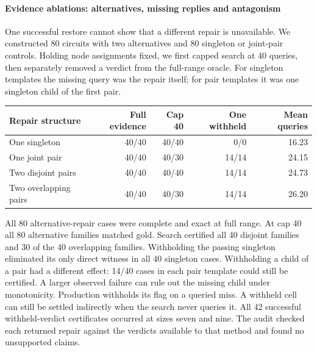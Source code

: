 \documentclass[11pt,letterpaper]{article}
\begin{document}
\paragraph{Evidence ablations: alternatives, missing replies and antagonism}\label{sec:evidence}
One successful restore cannot show that a different repair is unavailable. We constructed 80 circuits with two alternatives and 80 singleton or joint-pair controls. Holding node assignments fixed, we first capped search at 40 queries, then separately removed a verdict from the full-range oracle. For singleton templates the missing query was the repair itself; for pair templates it was one singleton child of the first pair.

\begin{center}\begin{minipage}{\linewidth}\centering
{}\label{tab:evidence}
\small\begin{tabular}{lrrrr}
\toprule
Repair structure & Full evidence & Cap 40 & One withheld & Mean queries \\
\midrule
One singleton & 40/40 & 40/40 & 0/0 & 16.23 \\
One joint pair & 40/40 & 40/30 & 14/14 & 24.15 \\
Two disjoint pairs & 40/40 & 40/40 & 14/14 & 24.73 \\
Two overlapping pairs & 40/40 & 40/30 & 14/14 & 26.20 \\
\bottomrule\end{tabular}
\end{minipage}\end{center}

All 80 alternative-repair cases were complete and exact at full range. At cap 40 all 80 alternative families matched gold. Search certified all 40 disjoint families and 30 of the 40 overlapping families. Withholding the passing singleton eliminated its only direct witness in all 40 singleton cases. Withholding a child of a pair had a different effect: 14/40 cases in each pair template could still be certified. A larger observed failure can rule out the missing child under monotonicity. Production withholds its flag on a queried miss. A withheld cell can still be settled indirectly when the search never queries it. All 42 successful withheld-verdict certificates occurred at sizes seven and nine. The audit checked each returned repair against the verdicts available to that method and found no unsupported claims.
\end{document}
